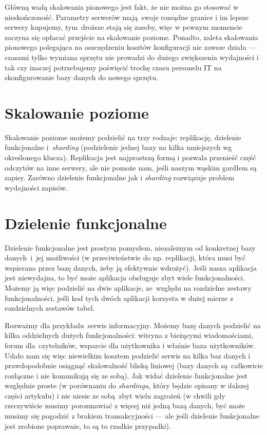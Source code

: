 \documentclass[a4paper,12pt]{article}
\begin{document}
Główną wadą skalowania pionowego jest fakt, że nie można go stosować w nieskończoność. Parametry serwerów mają swoje rozsądne granice i im lepsze serwery kupujemy, tym~droższe stają się zasoby, więc w pewnym momencie zaczyna się opłacać przejście na skalowanie poziome. Ponadto, zaleta skalowania pionowego polegająca na oszczędzeniu kosztów konfiguracji nie zawsze działa --- czasami tylko wymiana sprzętu nie prowadzi do dużego zwiększenia wydajności i tak czy inaczej potrzebujemy poświęcić trochę czasu personelu IT na skonfigurowanie bazy danych do nowego sprzętu.

\section{Skalowanie poziome}

Skalowanie poziome możemy podzielić na trzy rodzaje: replikację, dzielenie funkcjonalne i~\textit{sharding} (podzielenie jednej bazy na kilka mniejszych wg określonego klucza). Replikacja jest najprostszą formą i pozwala przenieść część odczytów na inne serwery, ale nie pomoże nam, jeśli naszym wąskim gardłem są zapisy. Zarówno dzielenie funkcjonalne jak i \textit{sharding} rozwiązuje problem wydajności zapisów.

\section{Dzielenie funkcjonalne}

Dzielenie funkcjonalne jest prostym pomysłem, niezależnym od konkretnej bazy danych~i~jej możliwości (w przeciwieństwie do np. replikacji, która musi być wspierana przez bazę danych, żeby ją efektywnie wdrożyć). Jeśli nasza aplikacja jest niewydajna, to być może aplikacja obsługuje zbyt wiele funkcjonalności. Możemy ją więc podzielić na dwie aplikacje, ze~względu na rozdzielne zestawy funkcjonalności, jeśli kod tych dwóch aplikacji korzysta w dużej mierze z rozdzielnych zestawów tabel.

Rozważmy dla przykładu serwis informacyjny. Możemy bazę danych podzielić na kilka oddzielnych dużych funkcjonalności: witryna z bieżącymi wiadomościami, forum dla~czytelników, wsparcie dla użytkownika i właśnie baza użytkowników. Udało nam się więc niewielkim kosztem podzielić serwis na kilka baz danych i prawdopodobnie osiągnąć skalowalność bliską liniowej (bazy danych są całkowicie rozłączne i nie komunikują się ze sobą). Jak widać dzielenie funkcjonalne jest względnie proste (w porównaniu do \textit{shardingu}, który będzie opisany w dalszej części artykułu) i nie niesie ze sobą zbyt wielu zagrożeń (w chwili gdy rzeczywiście musimy porozmawiać z więcej niż jedną bazą danych, być może musimy się pogodzić z brakiem transakcyjności --- ale jeśli dzielenie funkcjonalne jest zrobione poprawnie, to są to rzadkie przypadki).
\end{document}
